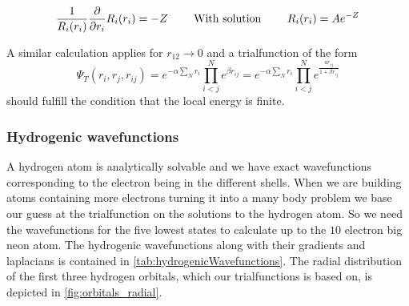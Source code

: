 		\begin{align}
			\frac{1}{R_i(r_i)} \pdv{}{r_i} R_i(r_i)	=  -Z  \qquad{ \text{ With solution }}  \qquad R_i(r_i) = A e^{-Z}
		\end{align}

		A similar calculation applies for \(r_{12} \rightarrow 0\) and a trialfunction of the form   \[\Psi_T(r_i,r_j,r_{ij}) = e^{ -\alpha \sum_{N}  r_i} \prod^N_{i < j}e^{\beta r_{ij}} = e^{ -\alpha \sum_{N}  r_i} \prod^N_{i < j}e^{\frac{a r_{ij}}{1 + \beta r_{ij}}} \] should fulfill the condition that the local energy is finite.
	\subsubsection{Hydrogenic wavefunctions}
		A hydrogen atom is analytically solvable and we have exact wavefunctions corresponding to the electron being in the different shells. When we are building atoms containing more electrons turning it into a many body problem we base our guess at the trialfunction on the solutions to the hydrogen atom. So we need the wavefunctions for the five lowest states to calculate up to the \(10\) electron big neon atom. The hydrogenic wavefunctions along with their gradients and laplacians is contained in \cref{tab:hydrogenicWavefunctions}. The radial distribution of the first three hydrogen orbitals, which our trialfunctions is based on, is depicted in \cref{fig:orbitals_radial}.


